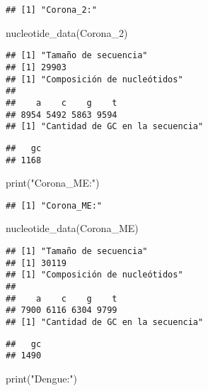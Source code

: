 \documentclass[
]{article}
\newenvironment{Shaded}{\begin{snugshade}}{\end{snugshade}}
\newcommand{\FunctionTok}[1]{\textcolor[rgb]{0.00,0.00,0.00}{#1}}
\newcommand{\NormalTok}[1]{#1}
\newcommand{\StringTok}[1]{\textcolor[rgb]{0.31,0.60,0.02}{#1}}
\begin{document}
\begin{verbatim}
## [1] "Corona_2:"
\end{verbatim}

\begin{Shaded}
\begin{Highlighting}[]
\FunctionTok{nucleotide\_data}\NormalTok{(Corona\_2)}
\end{Highlighting}
\end{Shaded}

\begin{verbatim}
## [1] "Tamaño de secuencia"
## [1] 29903
## [1] "Composición de nucleótidos"
## 
##    a    c    g    t 
## 8954 5492 5863 9594 
## [1] "Cantidad de GC en la secuencia"
\end{verbatim}

\begin{verbatim}
##   gc 
## 1168
\end{verbatim}

\begin{Shaded}
\begin{Highlighting}[]
\FunctionTok{print}\NormalTok{(}\StringTok{"Corona\_ME:"}\NormalTok{)}
\end{Highlighting}
\end{Shaded}

\begin{verbatim}
## [1] "Corona_ME:"
\end{verbatim}

\begin{Shaded}
\begin{Highlighting}[]
\FunctionTok{nucleotide\_data}\NormalTok{(Corona\_ME)}
\end{Highlighting}
\end{Shaded}

\begin{verbatim}
## [1] "Tamaño de secuencia"
## [1] 30119
## [1] "Composición de nucleótidos"
## 
##    a    c    g    t 
## 7900 6116 6304 9799 
## [1] "Cantidad de GC en la secuencia"
\end{verbatim}

\begin{verbatim}
##   gc 
## 1490
\end{verbatim}

\begin{Shaded}
\begin{Highlighting}[]
\FunctionTok{print}\NormalTok{(}\StringTok{"Dengue:"}\NormalTok{)}
\end{Highlighting}
\end{Shaded}
\end{document}
